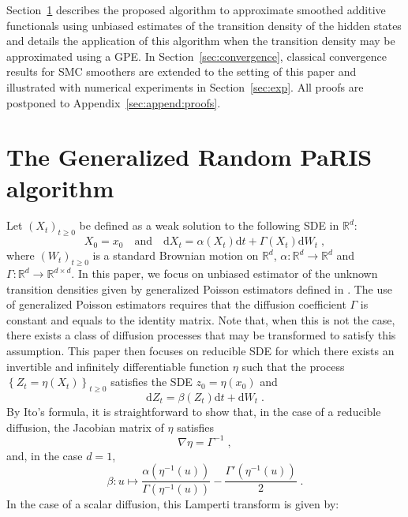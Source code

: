 \documentclass[12pt]{article}
\newcommand{\rmd}{\mathrm{d}}
\newcommand{\eqsp}{\;}
\newcommand{\1}{\mathrm{1}}
\begin{document}
Section~\ref{sec:rwparis} describes the proposed algorithm to approximate smoothed additive functionals using unbiased estimates of the transition density of the hidden states and details the application of this algorithm when the transition density may be approximated using a GPE. 
In Section~\ref{sec:convergence}, classical convergence results for SMC smoothers are extended to the setting of this paper and illustrated with numerical experiments in Section~\ref{sec:exp}. 
All proofs are postponed to Appendix~\ref{sec:append:proofs}.

\section{The Generalized Random PaRIS algorithm}
\label{sec:rwparis}
Let $(X_t)_{t\ge 0}$ be defined as a weak solution to the following SDE in $\mathbb{R}^d$:
\begin{equation}
\label{eq:target:sde}
X_0 = x_0\quad\mbox{and}\quad \rmd X_t = \alpha(X_t)\rmd t + \Gamma(X_t)\rmd W_t\eqsp,
\end{equation}
where $(W_t)_{t\ge 0}$ is a standard Brownian motion on $\mathbb{R}^d$, $\alpha: \mathbb{R}^d\to\mathbb{R}^d$ and $\Gamma: \mathbb{R}^d\to \mathbb{R}^{d\times d}$. 
In this paper, we focus on unbiased estimator of the unknown transition densities given by generalized Poisson estimators defined in \cite{fearnhead:papaspiliopoulos:roberts:2008}.
 The use of generalized Poisson estimators requires that the diffusion coefficient $\Gamma$ is constant and equals to the identity matrix.
  Note that, when this is not the case, there exists a class of diffusion processes that may be transformed to satisfy this assumption. 
  This paper then focuses on reducible SDE for which there exists an invertible and infinitely differentiable function $\eta$ such that the process $\left\{Z_t = \eta(X_t)\right\}_{t\ge 0}$ satisfies the SDE  $z_0 = \eta(x_0)$ and
\begin{equation}
\label{eq:diff:lamperti}
\mathrm{d}Z_t = \beta(Z_t)\mathrm{d}t + \mathrm{d}W_t\eqsp.
\end{equation}
By Ito's formula,  it is straightforward to show that, in the case of a reducible diffusion, the Jacobian matrix of $\eta$ satisfies
\[
\nabla \eta = \Gamma^{-1}\eqsp,
\]
and, in the case $d=1$,
\[
\beta:u \mapsto \frac{\alpha(\eta^{-1}(u))}{\Gamma(\eta^{-1}(u))} - \frac{\Gamma'(\eta^{-1}(u))}{2}\eqsp.
\]
In the case of a scalar diffusion, this Lamperti transform is given by:
\end{document}

